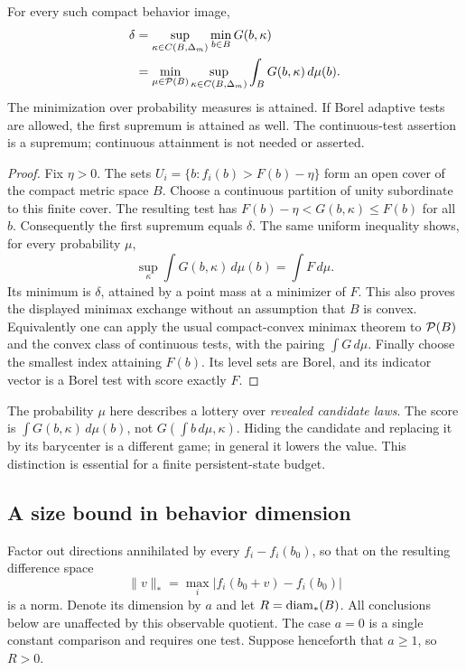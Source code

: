 \begin{theorem}
\label{thm:v17-dual}
For every such compact behavior image,
\begin{align}
 \delta
 &=\sup_{\kappa\in C(B,\Delta_m)}\min_{b\in B}G(b,\kappa)
 \label{eq:v17-dual}\\
 &=\min_{\mu\in\mathcal P(B)}\sup_{\kappa\in C(B,\Delta_m)}
                \int_B G(b,\kappa)\,d\mu(b).\nonumber
\end{align}
The minimization over probability measures is attained. If Borel
adaptive tests are allowed, the first supremum is attained as well.
The continuous-test assertion is a supremum; continuous attainment is
not needed or asserted.
\end{theorem}
\begin{proof}
Fix $\eta>0$. The sets $U_i=\{b:f_i(b)>F(b)-\eta\}$ form an open
cover of the compact metric space $B$. Choose a continuous partition
of unity subordinate to this finite cover. The resulting test has
$F(b)-\eta<G(b,\kappa)\le F(b)$ for all $b$. Consequently the first
supremum equals $\delta$. The same uniform inequality shows, for every
probability $\mu$,
\[
 \sup_\kappa\int G(b,\kappa)\,d\mu(b)=\int F\,d\mu.
\]
Its minimum is $\delta$, attained by a point mass at a minimizer of
$F$. This also proves the displayed minimax exchange without an
assumption that $B$ is convex. Equivalently one can apply the usual
compact-convex minimax theorem to $\mathcal P(B)$ and the convex class of
continuous tests, with the pairing $\int G\,d\mu$.
Finally choose the smallest index attaining $F(b)$. Its level sets are
Borel, and its indicator vector is a Borel test with score exactly
$F$.
\end{proof}

The probability $\mu$ here describes a lottery over \emph{revealed
candidate laws}. The score is $\int G(b,\kappa)\,d\mu(b)$, not
$G(\int b\,d\mu,\kappa)$. Hiding the candidate and replacing it by its
barycenter is a different game; in general it lowers the value. This
distinction is essential for a finite persistent-state budget.

\subsection{A size bound in behavior dimension}
Factor out directions annihilated by every $f_i-f_i(b_0)$, so that on
the resulting difference space
\[
 \|v\|_* =\max_i|f_i(b_0+v)-f_i(b_0)|
\]
is a norm. Denote its dimension by $a$ and let
$R=\operatorname{diam}_*(B)$. All conclusions below are unaffected by this observable
quotient. The case $a=0$ is a single constant comparison and requires
one test. Suppose henceforth that $a\ge1$, so $R>0$.

